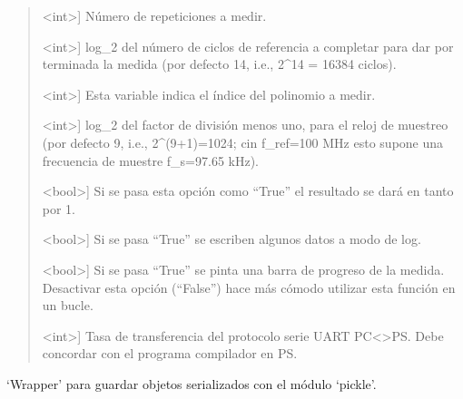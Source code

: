 \documentclass[letterpaper,10pt,english]{sphinxmanual}
\begin{document}
\begin{fulllineitems}
\begin{fulllineitems}
\begin{quote}
\begin{description}
\sphinxlineitem{N\_rep}{[}\textless{}int\textgreater{}{]}
\sphinxAtStartPar
Número de repeticiones a medir.

\sphinxlineitem{resol}{[}\textless{}int\textgreater{}{]}
\sphinxAtStartPar
log\_2 del número de ciclos de referencia a completar para dar 
por terminada la medida (por defecto 14, i.e., 2\textasciicircum{}14 = 16384 
ciclos).

\sphinxlineitem{poly}{[}\textless{}int\textgreater{}{]}
\sphinxAtStartPar
Esta variable indica el índice del polinomio a medir.

\sphinxlineitem{fdiv}{[}\textless{}int\textgreater{}{]}
\sphinxAtStartPar
log\_2 del factor de división menos uno, para el reloj de muestreo
(por defecto 9, i.e., 2\textasciicircum{}(9+1)=1024; cin f\_ref=100 MHz esto supone
una frecuencia de muestre f\_s=97.65 kHz).

\sphinxlineitem{bias}{[}\textless{}bool\textgreater{}{]}
\sphinxAtStartPar
Si se pasa esta opción como “True” el resultado se dará en 
tanto por 1.

\sphinxlineitem{log}{[}\textless{}bool\textgreater{}{]}
\sphinxAtStartPar
Si se pasa “True” se escriben algunos datos a modo de log.

\sphinxlineitem{verbose}{[}\textless{}bool\textgreater{}{]}
\sphinxAtStartPar
Si se pasa “True” se pinta una barra de progreso de la medida. 
Desactivar esta opción (“False”) hace más cómodo utilizar esta 
función en un bucle.

\sphinxlineitem{baudrate}{[}\textless{}int\textgreater{}{]}
\sphinxAtStartPar
Tasa de transferencia del protocolo serie UART PC\textless{}\textendash{}\textgreater{}PS. Debe 
concordar con el programa compilador en PS.

\end{description}
\end{quote}

\end{fulllineitems}


\begin{fulllineitems}
\label{\detokenize{myfpga:myfpga.ring_osc.GaloisMatrix.save}}
\pysigstartsignatures
{}
\pysigstopsignatures
\sphinxAtStartPar
‘Wrapper’ para guardar objetos serializados con el módulo ‘pickle’.

\end{fulllineitems}


\end{fulllineitems}
\end{document}
